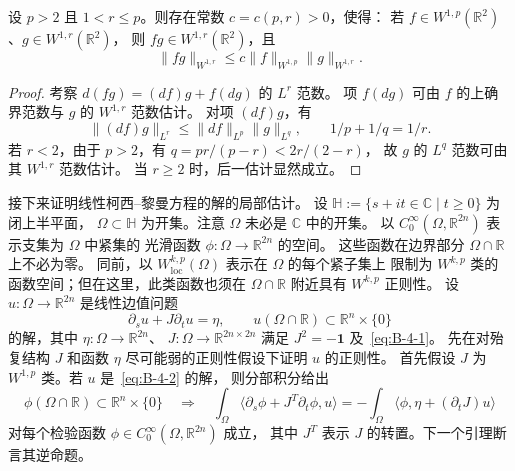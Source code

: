 \begin{lemma}\label{lem:B-4-5}
设 $p>2$ 且 $1<r\le p$。则存在常数 $c=c(p,r)>0$，使得：
若 $f\in W^{1,p}(\mathbb R^2)$、$g\in W^{1,r}(\mathbb R^2)$，
则 $fg\in W^{1,r}(\mathbb R^2)$，且
\[
  \|fg\|_{W^{1,r}}\le c\|f\|_{W^{1,p}}\|g\|_{W^{1,r}}.
\]
\end{lemma}
\begin{proof}
考察 $d(fg)=(df)g+f(dg)$ 的 $L^r$ 范数。
项 $f(dg)$ 可由 $f$ 的上确界范数与 $g$ 的 $W^{1,r}$ 范数估计。
对项 $(df)g$，有
\[
  \|(df)g\|_{L^r}\le\|df\|_{L^p}\|g\|_{L^q},\qquad
  1/p+1/q=1/r.
\]
若 $r<2$，由于 $p>2$，有 $q=pr/(p-r)<2r/(2-r)$，
故 $g$ 的 $L^q$ 范数可由其 $W^{1,r}$ 范数估计。
当 $r\ge2$ 时，后一估计显然成立。
\end{proof}

接下来证明线性柯西–黎曼方程的解的局部估计。
设 $\mathbb H:=\{s+it\in\mathbb C\mid t\ge0\}$ 为闭上半平面，
$\Omega\subset\mathbb H$ 为开集。注意 $\Omega$ 未必是 $\mathbb C$ 中的开集。
以 $C_0^\infty(\Omega,\mathbb R^{2n})$ 表示支集为 $\Omega$ 中紧集的
光滑函数 $\phi:\Omega\to\mathbb R^{2n}$ 的空间。
这些函数在边界部分 $\Omega\cap\mathbb R$ 上不必为零。
同前，以 $W^{k,p}_{\mathrm{loc}}(\Omega)$ 表示在 $\Omega$ 的每个紧子集上
限制为 $W^{k,p}$ 类的函数空间；但在这里，此类函数也须在
$\Omega\cap\mathbb R$ 附近具有 $W^{k,p}$ 正则性。
设 $u:\Omega\to\mathbb R^{2n}$ 是线性边值问题
\begin{equation}\label{eq:B-4-2}
  \partial_su+J\partial_tu=\eta,\qquad
  u(\Omega\cap\mathbb R)\subset\mathbb R^n\times\{0\}
\end{equation}
的解，其中 $\eta:\Omega\to\mathbb R^{2n}$、
$J:\Omega\to\mathbb R^{2n\times2n}$ 满足 $J^2=-\mathbf 1$ 及~\eqref{eq:B-4-1}。
先在对殆复结构 $J$ 和函数 $\eta$ 尽可能弱的正则性假设下证明 $u$ 的正则性。
首先假设 $J$ 为 $W^{1,p}$ 类。若 $u$ 是~\eqref{eq:B-4-2} 的解，
则分部积分给出
\begin{equation}\label{eq:B-4-3}
  \phi(\Omega\cap\mathbb R)\subset\mathbb R^n\times\{0\}
  \quad\Longrightarrow\quad
  \int_\Omega\langle\partial_s\phi+J^T\partial_t\phi,u\rangle
  =-\int_\Omega\langle\phi,\eta+(\partial_tJ)u\rangle
\end{equation}
对每个检验函数 $\phi\in C_0^\infty(\Omega,\mathbb R^{2n})$ 成立，
其中 $J^T$ 表示 $J$ 的转置。下一个引理断言其逆命题。

